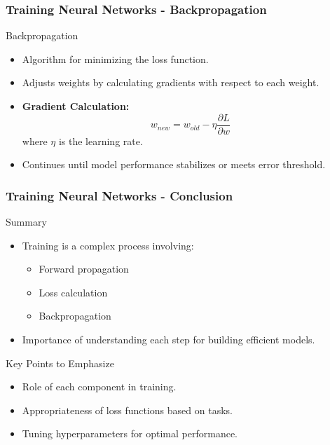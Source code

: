 \documentclass[aspectratio=169]{beamer}
\begin{document}
\begin{frame}[fragile]
    \frametitle{Training Neural Networks - Backpropagation}
    \begin{block}{Backpropagation}
        \begin{itemize}
            \item Algorithm for minimizing the loss function.
            \item Adjusts weights by calculating gradients with respect to each weight.
            \item \textbf{Gradient Calculation:}
            \begin{equation}
                w_{new} = w_{old} - \eta \frac{\partial L}{\partial w}
            \end{equation}
            where \( \eta \) is the learning rate.
            \item Continues until model performance stabilizes or meets error threshold.
        \end{itemize}
    \end{block}
\end{frame}

\begin{frame}[fragile]
    \frametitle{Training Neural Networks - Conclusion}
    \begin{block}{Summary}
        \begin{itemize}
            \item Training is a complex process involving:
            \begin{itemize}
                \item Forward propagation
                \item Loss calculation
                \item Backpropagation
            \end{itemize}
            \item Importance of understanding each step for building efficient models.
        \end{itemize}
    \end{block}
    \begin{block}{Key Points to Emphasize}
        \begin{itemize}
            \item Role of each component in training.
            \item Appropriateness of loss functions based on tasks.
            \item Tuning hyperparameters for optimal performance.
        \end{itemize}
    \end{block}
\end{frame}
\end{document}
